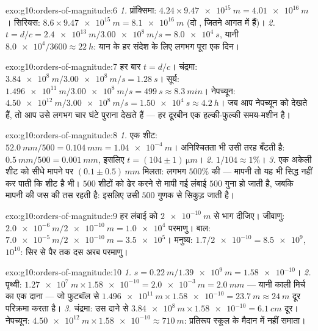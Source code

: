 \begin{solution}{exo:g10:orders-of-magnitude:6}
\emph{1.} प्रॉक्सिमा: $4.24 \times \qty{9.47e15}{m} = \qty{4.01e16}{m}$। सिरियस: $8.6 \times \qty{9.47e15}{m} = \qty{8.1e16}{m}$ (दो ,
जितने आगत में हैं)।
\emph{2.} $t = d/c = \qty{2.4e13}{m} / \qty{3.00e8}{m/s}
= \qty{8.0e4}{s}$, यानी $\num{8.0e4}/3600 \approx \qty{22}{h}$: यान के हर संदेश के लिए लगभग पूरा एक दिन।
\end{solution}

\begin{solution}{exo:g10:orders-of-magnitude:7}
हर बार $t = d/c$। चंद्रमा: $\qty{3.84e8}{m}/\qty{3.00e8}{m/s} = \qty{1.28}{s}$। सूर्य: $\qty{1.496e11}{m}/\qty{3.00e8}{m/s} = \qty{499}{s} \approx
\qty{8.3}{min}$। नेपच्यून: $\qty{4.50e12}{m}/\qty{3.00e8}{m/s} = \qty{1.50e4}{s} \approx
\qty{4.2}{h}$। जब आप
नेपच्यून को देखते हैं, तो आप उसे लगभग चार घंटे पुराना देखते हैं --- हर
दूरबीन एक हल्की-फुल्की समय-मशीन है।
\end{solution}

\begin{solution}{exo:g10:orders-of-magnitude:8}
\emph{1.} एक शीट: $\qty{52.0}{mm}/500 = \qty{0.104}{mm}
= \qty{1.04e-4}{m}$। अनिश्चितता भी उसी तरह बँटती है: $\qty{0.5}{mm}/500 = \qty{0.001}{mm}$,
इसलिए $t = (104 \pm 1)\,\unit{\micro m}$।
\emph{2.} $1/104 \approx 1\%$।
\emph{3.} एक अकेली शीट को सीधे मापने पर $(0.1 \pm 0.5)\,\unit{mm}$ मिलता: लगभग $500\%$ की
 --- मापनी तो यह भी सिद्ध नहीं कर पाती कि शीट
है भी। $500$ शीटों को ढेर करने से मापी गई लंबाई $500$ गुना हो जाती
है, जबकि मापनी की  जस की तस रहती है: इसलिए
 उसी $500$ गुणक से सिकुड़ जाती है।
\end{solution}

\begin{solution}{exo:g10:orders-of-magnitude:9}
हर लंबाई को $\qty{2e-10}{m}$ से भाग दीजिए। जीवाणु: $\qty{2.0e-6}{m}/\qty{2e-10}{m} = \num{1.0e4}$ परमाणु। बाल: $\qty{7.0e-5}{m}/\qty{2e-10}{m} = \num{3.5e5}$।
मनुष्य: $1.7/\num{2e-10} = \num{8.5e9}$,  $10^{10}$: सिर से पैर तक दस अरब
परमाणु।
\end{solution}

\begin{solution}{exo:g10:orders-of-magnitude:10}
\emph{1.} $s = \qty{0.22}{m}/\qty{1.39e9}{m} = \num{1.58e-10}$।
\emph{2.} पृथ्वी: $\qty{1.27e7}{m} \times \num{1.58e-10} = \qty{2.0e-3}{m} =
\qty{2.0}{mm}$ --- यानी काली मिर्च का एक दाना --- जो फुटबॉल
से $\qty{1.496e11}{m} \times \num{1.58e-10} = \qty{23.7}{m} \approx
\qty{24}{m}$ दूर परिक्रमा करता है।
\emph{3.} चंद्रमा: उस दाने से $\qty{3.84e8}{m} \times \num{1.58e-10} = \qty{6.1}{cm}$ दूर। नेपच्यून: $\qty{4.50e12}{m} \times \num{1.58e-10} \approx \qty{710}{m}$: प्रतिरूप
स्कूल के मैदान में नहीं समाता।
\end{solution}


